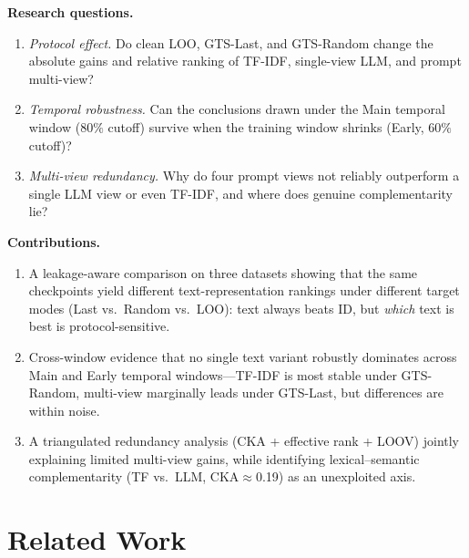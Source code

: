 \documentclass[sigconf,natbib=true,anonymous]{acmart}
\newcommand{\tfidf}{\textsc{TF-IDF}\xspace}
\newcommand{\llm}{\textsc{LLM}\xspace}
\begin{document}
\smallskip\noindent\textbf{Research questions.}
\begin{enumerate}[leftmargin=*,itemsep=1pt]
\item[\textbf{RQ1}] \emph{Protocol effect.}
Do clean LOO, GTS-Last, and GTS-Random change the absolute gains and relative ranking of \tfidf, single-view \llm, and prompt multi-view?
\item[\textbf{RQ2}] \emph{Temporal robustness.}
Can the conclusions drawn under the Main temporal window ($80\%$ cutoff) survive when the training window shrinks (Early, $60\%$ cutoff)?
\item[\textbf{RQ3}] \emph{Multi-view redundancy.}
Why do four prompt views not reliably outperform a single \llm view or even \tfidf, and where does genuine complementarity lie?
\end{enumerate}

\smallskip\noindent\textbf{Contributions.}
\begin{enumerate}[leftmargin=*,itemsep=1pt]
\item A leakage-aware comparison on three datasets showing that the same checkpoints yield different text-representation rankings under different target modes (Last vs.\ Random vs.\ LOO): text always beats ID, but \emph{which} text is best is protocol-sensitive.
\item Cross-window evidence that no single text variant robustly dominates across Main and Early temporal windows---\tfidf is most stable under GTS-Random, multi-view marginally leads under GTS-Last, but differences are within noise.
\item A triangulated redundancy analysis (CKA + effective rank + LOOV) jointly explaining limited multi-view gains, while identifying lexical--semantic complementarity (TF vs.\ LLM, CKA$\approx$0.19) as an unexploited axis.
\end{enumerate}

\section{Related Work}
\label{sec:related}
\end{document}
